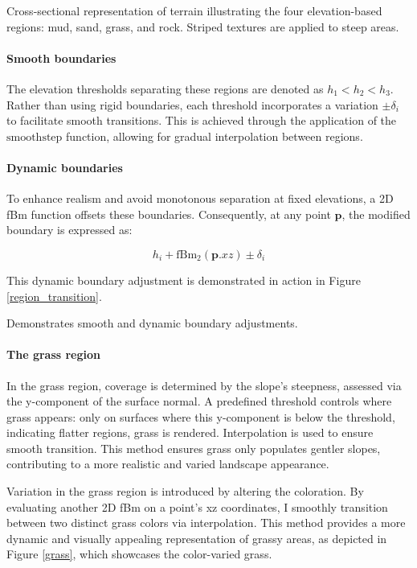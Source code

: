 {Cross-sectional representation of terrain illustrating the four elevation-based regions: mud, sand, grass, and rock. Striped textures are applied to steep areas.}

\paragraph{Smooth boundaries}
The elevation thresholds separating these regions are denoted as $h_{1} < h_{2} < h_{3}$. Rather than using rigid boundaries, each threshold incorporates a variation $\pm \delta_i$ to facilitate smooth transitions. This is achieved through the application of the $\text{smoothstep}$ function, allowing for gradual interpolation between regions.

\paragraph{Dynamic boundaries}
To enhance realism and avoid monotonous separation at fixed elevations, a 2D fBm function offsets these boundaries. Consequently, at any point $\mathbf{p}$, the modified boundary is expressed as:

\begin{equation}
    h_{i} + \text{fBm}_{2}(\mathbf{p}.xz) \pm \delta_i
\end{equation}

This dynamic boundary adjustment is demonstrated in action in Figure \ref{region_transition}.

{Demonstrates smooth and dynamic boundary adjustments.}

\paragraph{The grass region}
In the grass region, coverage is determined by the slope's steepness, assessed via the y-component of the surface normal. A predefined threshold controls where grass appears: only on surfaces where this y-component is below the threshold, indicating flatter regions, grass is rendered. Interpolation is used to ensure smooth transition. This method ensures grass only populates gentler slopes, contributing to a more realistic and varied landscape appearance.

Variation in the grass region is introduced by altering the coloration. By evaluating another 2D fBm on a point's xz coordinates, I smoothly transition between two distinct grass colors via interpolation. This method provides a more dynamic and visually appealing representation of grassy areas, as depicted in Figure \ref{grass}, which showcases the color-varied grass.

